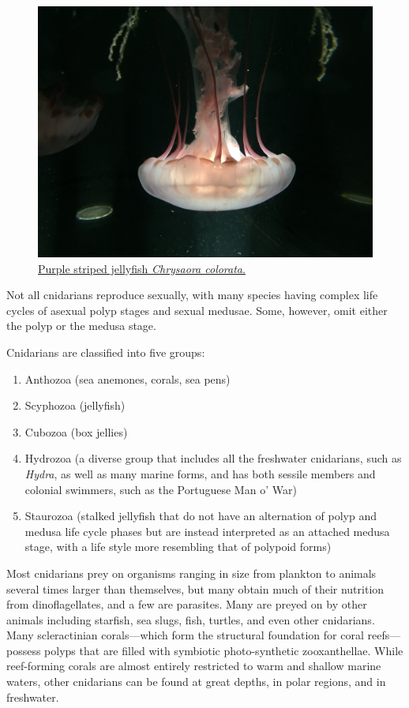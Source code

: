 \begin{figure}

{\centering \includegraphics[width=0.7\linewidth]{./figures/porifera/chrysaora_colorata}

}

\caption{\href{https://en.wikipedia.org/wiki/Chrysaora_colorata}{Purple striped
jellyfish \emph{Chrysaora colorata}.}}\label{fig:chrysaora}
\end{figure}

Not all cnidarians reproduce sexually, with many species having complex
life cycles of asexual polyp stages and sexual medusae. Some, however,
omit either the polyp or the medusa stage.

Cnidarians are classified into five groups:

\begin{enumerate}
\def\labelenumi{\arabic{enumi}.}
\tightlist
\item
  Anthozoa (sea anemones, corals, sea pens)
\item
  Scyphozoa (jellyfish)
\item
  Cubozoa (box jellies)
\item
  Hydrozoa (a diverse group that includes all the freshwater
  cnidarians, such as \emph{Hydra}, as well as many marine forms, and
  has both sessile members and colonial swimmers, such as the Portuguese
  Man o' War)
\item
  Staurozoa (stalked jellyfish that do not have an alternation of
  polyp and medusa life cycle phases but are instead interpreted as an
  attached medusa stage, with a life style more resembling that of
  polypoid forms)
\end{enumerate}

Most cnidarians prey on organisms ranging in size from plankton to
animals several times larger than themselves, but many obtain much of
their nutrition from dinoflagellates, and a few are parasites. Many are
preyed on by other animals including starfish, sea slugs, fish, turtles,
and even other cnidarians. Many scleractinian corals---which form the
structural foundation for coral reefs---possess polyps that are filled
with symbiotic photo-synthetic zooxanthellae. While reef-forming corals
are almost entirely restricted to warm and shallow marine waters, other
cnidarians can be found at great depths, in polar regions, and in
freshwater.

